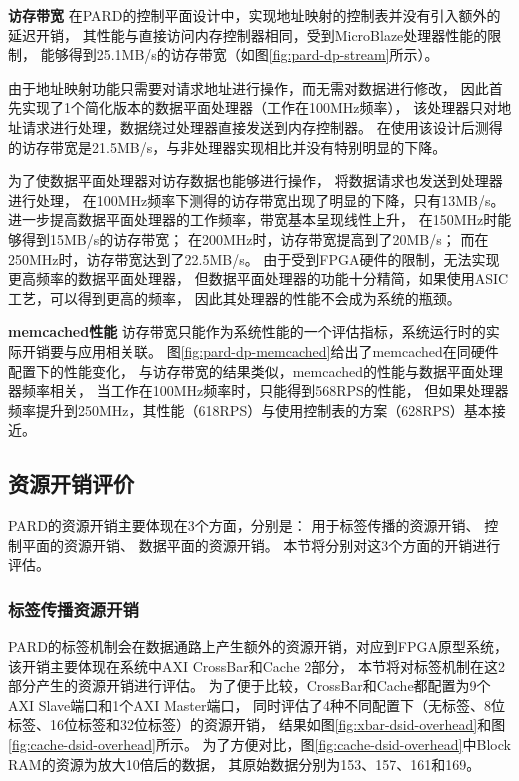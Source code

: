 \textbf{访存带宽}\quad
在PARD的控制平面设计中，实现地址映射的控制表并没有引入额外的延迟开销，
其性能与直接访问内存控制器相同，受到MicroBlaze处理器性能的限制，
能够得到25.1MB/s的访存带宽（如图\ref{fig:pard-dp-stream}所示）。

由于地址映射功能只需要对请求地址进行操作，而无需对数据进行修改，
因此首先实现了1个简化版本的数据平面处理器（工作在100MHz频率），
该处理器只对地址请求进行处理，数据绕过处理器直接发送到内存控制器。
在使用该设计后测得的访存带宽是21.5MB/s，与非处理器实现相比并没有特别明显的下降。

为了使数据平面处理器对访存数据也能够进行操作，
将数据请求也发送到处理器进行处理，
在100MHz频率下测得的访存带宽出现了明显的下降，只有13MB/s。
进一步提高数据平面处理器的工作频率，带宽基本呈现线性上升，
在150MHz时能够得到15MB/s的访存带宽；
在200MHz时，访存带宽提高到了20MB/s；
而在250MHz时，访存带宽达到了22.5MB/s。
由于受到FPGA硬件的限制，无法实现更高频率的数据平面处理器，
但数据平面处理器的功能十分精简，如果使用ASIC工艺，可以得到更高的频率，
因此其处理器的性能不会成为系统的瓶颈。

\textbf{memcached性能}\quad
访存带宽只能作为系统性能的一个评估指标，系统运行时的实际开销要与应用相关联。
图\ref{fig:pard-dp-memcached}给出了memcached在同硬件配置下的性能变化，
与访存带宽的结果类似，memcached的性能与数据平面处理器频率相关，
当工作在100MHz频率时，只能得到568RPS的性能，
但如果处理器频率提升到250MHz，其性能（618RPS）与使用控制表的方案（628RPS）基本接近。


\subsection{资源开销评价}

PARD的资源开销主要体现在3个方面，分别是：
用于标签传播的资源开销、
控制平面的资源开销、
数据平面的资源开销。
本节将分别对这3个方面的开销进行评估。

\subsubsection{标签传播资源开销}

PARD的标签机制会在数据通路上产生额外的资源开销，对应到FPGA原型系统，
该开销主要体现在系统中AXI CrossBar和Cache 2部分，
本节将对标签机制在这2部分产生的资源开销进行评估。
为了便于比较，CrossBar和Cache都配置为9个AXI Slave端口和1个AXI Master端口，
同时评估了4种不同配置下（无标签、8位标签、16位标签和32位标签）的资源开销，
结果如图\ref{fig:xbar-dsid-overhead}和图\ref{fig:cache-dsid-overhead}所示。
为了方便对比，图\ref{fig:cache-dsid-overhead}中Block RAM的资源为放大10倍后的数据，
其原始数据分别为153、157、161和169。

